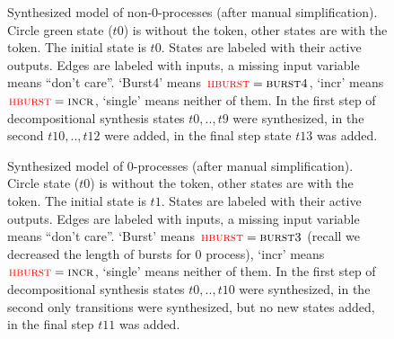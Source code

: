 % 
\begin{figure}[t]
\caption{Synthesized model of non-$0$-processes (after manual simplification).
Circle green state ($t0$) is without the token, other states are with the token.
The initial state is $t0$.
States are labeled with their active outputs.
Edges are labeled with inputs, a missing input variable means ``don't care''.
`Burst4' means $\textsc{\textcolor{red}{hburst}}=\textsc{burst4}$, `incr' means $\textsc{\textcolor{red}{hburst}}=\textsc{incr}$, `single' means neither of them.
In the first step of decompositional synthesis states $t0,..,t9$ were synthesized, in the second $t10,..,t12$ were added, in the final step state $t13$ was added.}
\label{amba:fig:ith-model}
\end{figure}
%
\begin{figure}[t]
\caption{Synthesized model of $0$-processes (after manual simplification).
Circle state ($t0$) is without the token, other states are with the token.
The initial state is $t1$.
States are labeled with their active outputs.
Edges are labeled with inputs, a missing input variable means ``don't care''.
`Burst' means $\textsc{\textcolor{red}{hburst}}=\textsc{burst3}$ (recall we decreased the length of bursts for 0 process), `incr' means $\textsc{\textcolor{red}{hburst}}=\textsc{incr}$, `single' means neither of them.
In the first step of decompositional synthesis states $t0,..,t10$ were synthesized, in the second only transitions were synthesized, but no new states added, in the final step $t11$ was added.}
\label{amba:fig:zero-model}
\end{figure}


